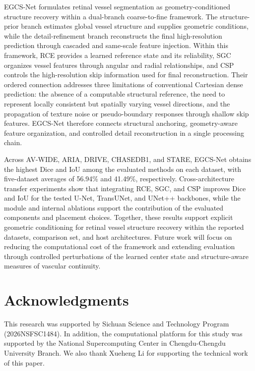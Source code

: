 \documentclass[a4paper,fleqn]{cas-sc}
\begin{document}
EGCS-Net formulates retinal vessel segmentation as geometry-conditioned structure recovery within a dual-branch coarse-to-fine framework.
The structure-prior branch estimates global vessel structure and supplies geometric conditions, while the detail-refinement branch reconstructs the final high-resolution prediction through cascaded and same-scale feature injection.
Within this framework, RCE provides a learned reference state and its reliability, SGC organizes vessel features through angular and radial relationships, and CSP controls the high-resolution skip information used for final reconstruction.
Their ordered connection addresses three limitations of conventional Cartesian dense prediction: the absence of a computable structural reference, the need to represent locally consistent but spatially varying vessel directions, and the propagation of texture noise or pseudo-boundary responses through shallow skip features.
EGCS-Net therefore connects structural anchoring, geometry-aware feature organization, and controlled detail reconstruction in a single processing chain.

Across AV-WIDE, ARIA, DRIVE, CHASEDB1, and STARE, EGCS-Net obtains the highest Dice and IoU among the evaluated methods on each dataset, with five-dataset averages of 56.94\% and 41.49\%, respectively.
Cross-architecture transfer experiments show that integrating RCE, SGC, and CSP improves Dice and IoU for the tested U-Net, TransUNet, and UNet++ backbones, while the module and internal ablations support the contribution of the evaluated components and placement choices.
Together, these results support explicit geometric conditioning for retinal vessel structure recovery within the reported datasets, comparison set, and host architectures.
Future work will focus on reducing the computational cost of the framework and extending evaluation through controlled perturbations of the learned center state and structure-aware measures of vascular continuity.

\section*{Acknowledgments}
This research was supported by Sichuan Science and Technology Program (2026NSFSC1484). In addition, the
computational platform for this study was supported by the National Supercomputing Center in Chengdu-Chengdu
University Branch. We also thank Xueheng Li for supporting the technical work of this paper.






\end{document}
